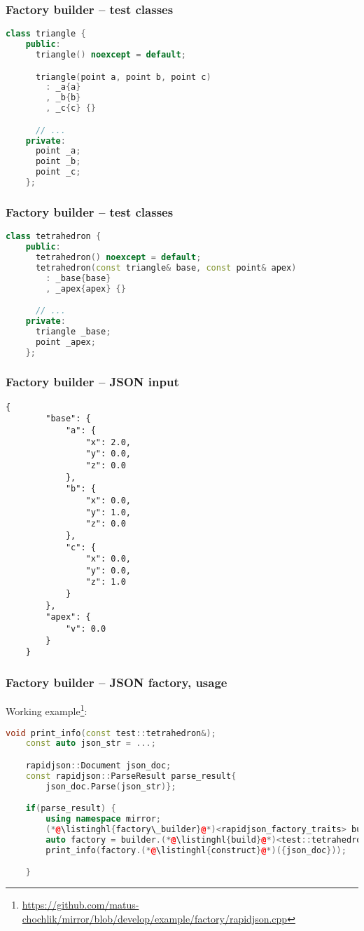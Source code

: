 \documentclass[compress,table,xcolor=table]{beamer}
\begin{document}
\begin{frame}[fragile]
\frametitle{Factory builder -- test classes}
    \begin{lstlisting}[language=c++]
    class triangle {
    public:
      triangle() noexcept = default;

      triangle(point a, point b, point c)
        : _a{a}
        , _b{b}
        , _c{c} {}

      // ...
    private:
      point _a;
      point _b;
      point _c;
    };
    \end{lstlisting}
\end{frame}
\begin{frame}[fragile]
\frametitle{Factory builder -- test classes}
    \begin{lstlisting}[language=c++]
    class tetrahedron {
    public:
      tetrahedron() noexcept = default;
      tetrahedron(const triangle& base, const point& apex)
        : _base{base}
        , _apex{apex} {}

      // ...
    private:
      triangle _base;
      point _apex;
    };
    \end{lstlisting}
\end{frame}
\begin{frame}[fragile]
\frametitle{Factory builder -- JSON input}
    \begin{lstlisting}[basicstyle=\scriptsize\ttfamily]
    {
        "base": {
            "a": {
                "x": 2.0,
                "y": 0.0,
                "z": 0.0
            },
            "b": {
                "x": 0.0,
                "y": 1.0,
                "z": 0.0
            },
            "c": {
                "x": 0.0,
                "y": 0.0,
                "z": 1.0
            }
        },
        "apex": {
            "v": 0.0
        }
    }
    \end{lstlisting}
\end{frame}
\begin{frame}[fragile]
\frametitle{Factory builder -- JSON factory, usage}
    \large
    Working example\footnote{
        \url{https://github.com/matus-chochlik/mirror/blob/develop/example/factory/rapidjson.cpp}}:
    \begin{lstlisting}[language=c++]
    void print_info(const test::tetrahedron&);
    const auto json_str = ...;

    rapidjson::Document json_doc;
    const rapidjson::ParseResult parse_result{
        json_doc.Parse(json_str)};

    if(parse_result) {
        using namespace mirror;
        (*@\listinghl{factory\_builder}@*)<rapidjson_factory_traits> builder;
        auto factory = builder.(*@\listinghl{build}@*)<test::tetrahedron>();
        print_info(factory.(*@\listinghl{construct}@*)({json_doc}));

    }
    \end{lstlisting}
\end{frame}
\end{document}
